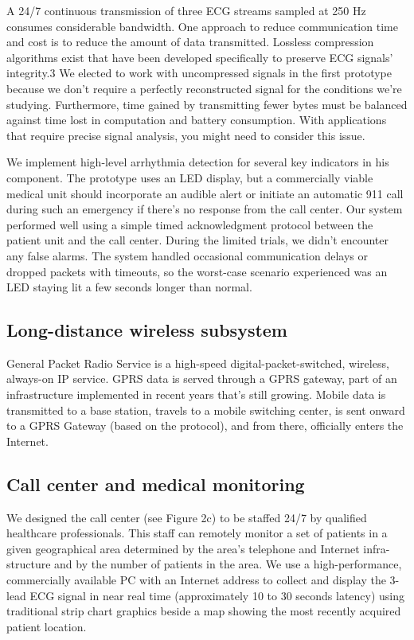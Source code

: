 \documentclass[a4paper,12pt]{article}
\begin{document}
A 24/7 continuous transmission of three ECG streams sampled at 250 Hz consumes considerable bandwidth. One approach to reduce communication time and cost is to reduce the amount of data transmitted. Lossless compression algorithms exist that have been developed specifically to preserve ECG signals’ integrity.3 We elected to work with uncompressed signals in the first prototype because we don’t require a perfectly reconstructed signal for the conditions we’re studying. Furthermore, time gained by transmitting fewer bytes must be balanced against time lost in computation and battery consumption. With applications that require precise signal analysis, you might need to consider this issue.

We implement high-level arrhythmia detection for several key indicators in his component. The prototype uses an LED display, but a commercially viable medical unit should incorporate an audible alert or initiate an automatic 911 call during such an emergency if there’s no response from the call center. Our system performed well using a simple timed acknowledgment protocol between the patient unit and the call center. During the limited trials, we didn’t encounter any false alarms. The system handled occasional communication delays or dropped packets with timeouts, so the worst-case scenario experienced was an LED staying lit a few seconds longer than normal.

\subsection{Long-distance wireless subsystem}


General Packet Radio Service is a high-speed digital-packet-switched, wireless, always-on IP service. GPRS data is served through a GPRS gateway, part of an infrastructure implemented in recent years that’s still growing. Mobile data is transmitted to a base station, travels to a mobile switching center, is sent onward to a GPRS Gateway (based on the protocol), and from there, officially enters the Internet.

\subsection{Call center and medical monitoring}


We designed the call center (see Figure 2c) to be staffed 24/7 by qualified healthcare professionals. This staff can remotely monitor a set of patients in a given geographical area determined by the area’s telephone and Internet infra-structure and by the number of patients in the area. We use a high-performance, commercially available PC with an Internet address to collect and display the 3-lead ECG signal in near real time (approximately 10 to 30 seconds latency) using traditional strip chart graphics beside a map showing the most recently acquired patient location.
\end{document}
